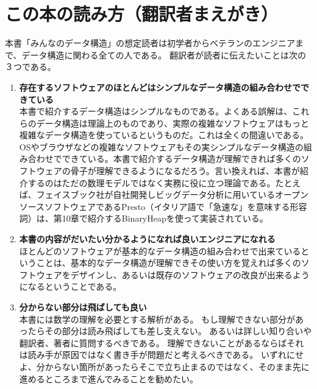 \chapter*{この本の読み方（翻訳者まえがき）}

本書「みんなのデータ構造」の想定読者は初学者からベテランのエンジニアまで、データ構造に関わる全ての人である。
翻訳者が読者に伝えたいことは次の３つである。

\begin{enumerate}
\item {\bf 存在するソフトウェアのほとんどはシンプルなデータ構造の組み合わせでできている} \\
本書で紹介するデータ構造はシンプルなものである。よくある誤解は、これらのデータ構造は理論上のものであり、実際の複雑なソフトウェアはもっと複雑なデータ構造を使っているというものだ。これは全くの間違いである。OSやブラウザなどの複雑なソフトウェアもその実シンプルなデータ構造の組み合わせでできている。本書で紹介するデータ構造が理解できれば多くのソフトウェアの骨子が理解できるようになるだろう。言い換えれば、本書が紹介するのはただの数理モデルではなく実務に役に立つ理論である。たとえば、フェイスブック社が自社開発しビッグデータ分析に用いているオープンソースソフトウェアであるPresto（イタリア語で「急速な」を意味する形容詞）は、第10章で紹介するBinaryHeapを使って実装されている。

\item {\bf 本書の内容がだいたい分かるようになれば良いエンジニアになれる} \\
ほとんどのソフトウェアが基本的なデータ構造の組み合わせで出来ているということは、基本的なデータ構造が理解できその使い方を覚えれば多くのソフトウェアをデザインし、あるいは既存のソフトウェアの改良が出来るようになるということである。

\item {\bf 分からない部分は飛ばしても良い} \\
本書には数学の理解を必要とする解析がある。
もし理解できない部分があったらその部分は読み飛ばしても差し支えない。
あるいは詳しい知り合いや翻訳者、著者に質問するべきである。
理解できないことがあるならばそれは読み手が原因ではなく書き手が問題だと考えるべきである。
いずれにせよ、分からない箇所があったらそこで立ち止まるのではなく、そのまま先に進めるところまで進んでみることを勧めたい。

\end{enumerate}

